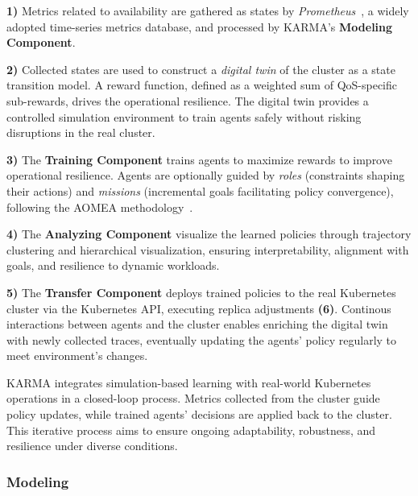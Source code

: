 \textbf{1)} Metrics related to availability are gathered as states by \textit{Prometheus}~\cite{prometheus}, a widely adopted time-series metrics database, and processed by KARMA's \textbf{Modeling Component}.

\textbf{2)} Collected states are used to construct a \textit{digital twin} of the cluster as a state transition model. A reward function, defined as a weighted sum of QoS-specific sub-rewards, drives the operational resilience. The digital twin provides a controlled simulation environment to train agents safely without risking disruptions in the real cluster.

\textbf{3)} The \textbf{Training Component} trains agents to maximize rewards to improve operational resilience. Agents are optionally guided by \textit{roles} (constraints shaping their actions) and \textit{missions} (incremental goals facilitating policy convergence), following the AOMEA methodology~\cite{soule2024aomea}.

\textbf{4)} The \textbf{Analyzing Component} visualize the learned policies through trajectory clustering and hierarchical visualization, ensuring interpretability, alignment with goals, and resilience to dynamic workloads.

\textbf{5)} The \textbf{Transfer Component} deploys trained policies to the real Kubernetes cluster via the Kubernetes API, executing replica adjustments \textbf{(6)}. Continous interactions between agents and the cluster enables enriching the digital twin with newly collected traces, eventually updating the agents' policy regularly to meet environment's changes.

KARMA integrates simulation-based learning with real-world Kubernetes operations in a closed-loop process. Metrics collected from the cluster guide policy updates, while trained agents' decisions are applied back to the cluster. This iterative process aims to ensure ongoing adaptability, robustness, and resilience under diverse conditions.


\subsubsection{Modeling}

